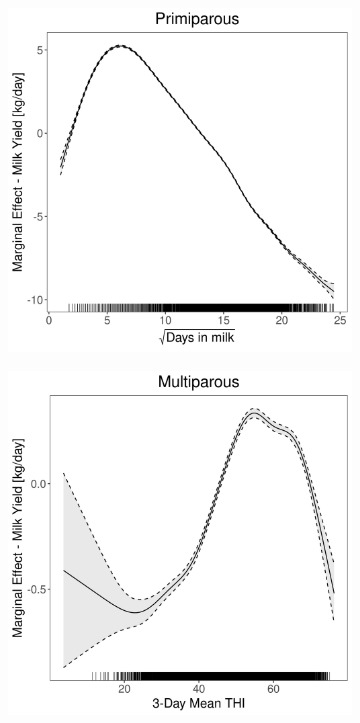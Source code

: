 \begin{figure}[H]
\begin{subfigure}[b]{0.45\textwidth}
    \end{subfigure}
    \hspace{0.05\textwidth} %
    \begin{subfigure}[b]{0.45\textwidth}
        \centering
        \includegraphics[width=\textwidth]{thesis/figures/models/milk/after2010/ho_milk_after2010/ho_milk_after2010_marginal_dim_milk_primi.png}
    \end{subfigure}
    \begin{subfigure}[b]{0.45\textwidth}
        \centering
        \includegraphics[width=\textwidth]{thesis/figures/models/milk/after2010/ho_milk_after2010/ho_milk_after2010_marginal_thi_milk_multi.png}

\end{subfigure}
\end{figure}

